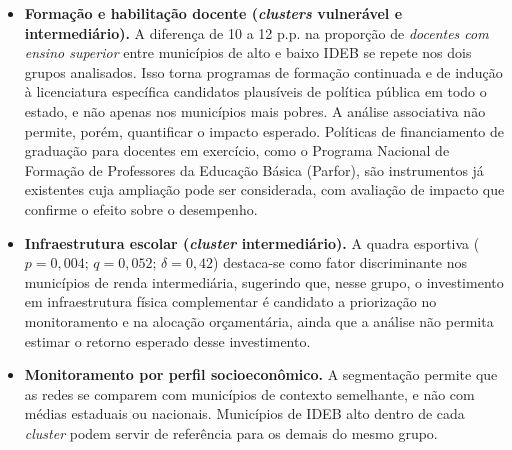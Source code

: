 \begin{itemize}
  \item \textbf{Formação e habilitação docente (\textit{clusters} vulnerável e intermediário).} A diferença de 10 a 12 p.p. na proporção de \textit{docentes com ensino superior} entre municípios de alto e baixo IDEB se repete nos dois grupos analisados. Isso torna programas de formação continuada e de indução à licenciatura específica candidatos plausíveis de política pública em todo o estado, e não apenas nos municípios mais pobres. A análise associativa não permite, porém, quantificar o impacto esperado. Políticas de financiamento de graduação para docentes em exercício, como o Programa Nacional de Formação de Professores da Educação Básica (Parfor), são instrumentos já existentes cuja ampliação pode ser considerada, com avaliação de impacto que confirme o efeito sobre o desempenho.

  \item \textbf{Infraestrutura escolar (\textit{cluster} intermediário).} A quadra esportiva ($p = 0{,}004$; $q = 0{,}052$; $\delta = 0{,}42$) destaca-se como fator discriminante nos municípios de renda intermediária, sugerindo que, nesse grupo, o investimento em infraestrutura física complementar é candidato a priorização no monitoramento e na alocação orçamentária, ainda que a análise não permita estimar o retorno esperado desse investimento.

  \item \textbf{Monitoramento por perfil socioeconômico.} A segmentação permite que as redes se comparem com municípios de contexto semelhante, e não com médias estaduais ou nacionais. Municípios de IDEB alto dentro de cada \textit{cluster} podem servir de referência para os demais do mesmo grupo.
\end{itemize}
